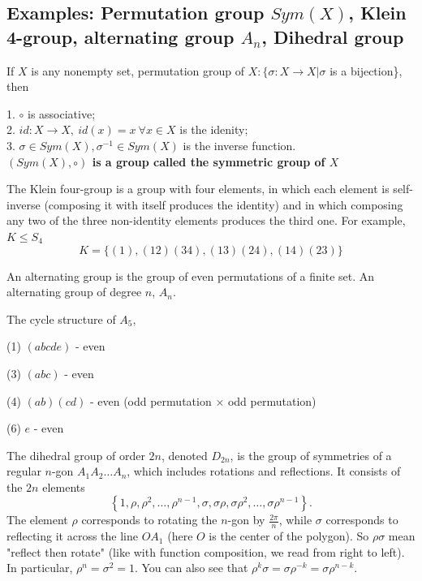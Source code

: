 \documentclass[11pt]{elegantbook}
\begin{document}
\subsection{Examples: Permutation group $Sym(X)$, Klein 4-group, alternating group $A_n$, Dihedral group}
\begin{example}
If $X$ is any nonempty set, permutation group of $X: \{\sigma:X \rightarrow X| \sigma$ is a bijection\}, then
\end{example}
1. $\circ$ is associative;\\
2. $id: X \rightarrow X,\ id(x)=x\ \forall x\in X$ is the idenity;\\
3. $\sigma\in Sym(X), \sigma^{-1}\in Sym(X)$ is the inverse function.\\
\textbf{$(Sym(X),\circ)$ is a group called the symmetric group of $X$}

\begin{example}
    The Klein four-group is a group with four elements, in which each element is self-inverse (composing it with itself produces the identity) and in which composing any two of the three non-identity elements produces the third one. For example, $K\leq S_4$
    $$K=\{(1),(12)(34),(13)(24),(14)(23)\}$$
\end{example}

\begin{example}
    An alternating group is the group of even permutations of a finite set. An alternating group of degree $n$, $A_n$.
\end{example}
The cycle structure of $A_5$,

(1) $(a b c d e)$ - even

(3) $(a b c)$ - even

(4) $(a b)(c d)$ - even (odd permutation $\times$ odd permutation)

(6) $e$ - even

\begin{example}
\end{example}
The dihedral group of order $2 n$, denoted $D_{2 n}$, is the group of symmetries of a regular $n$-gon $A_{1} A_{2} \ldots A_{n}$, which includes rotations and reflections. It consists of the $2 n$ elements
$$
\left\{1, \rho, \rho^{2}, \ldots, \rho^{n-1}, \sigma, \sigma \rho, \sigma \rho^{2}, \ldots, \sigma \rho^{n-1}\right\} .
$$
The element $\rho$ corresponds to rotating the $n$-gon by $\frac{2 \pi}{n}$, while $\sigma$ corresponds to reflecting it across the line $O A_{1}$ (here $O$ is the center of the polygon). So $\rho \sigma$ mean "reflect then rotate" (like with function composition, we read from right to left).
In particular, $\rho^{n}=\sigma^{2}=1$. You can also see that $\rho^{k} \sigma=\sigma \rho^{-k}=\sigma\rho^{n-k}$.
\end{document}
